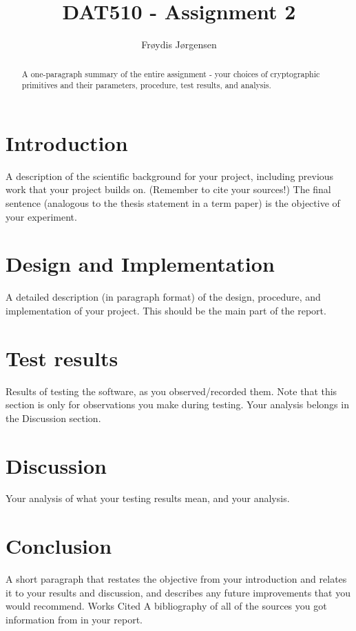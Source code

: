 \documentclass[12pt, letterpaper]{article}
\title{DAT510 - Assignment 2}
\author{Fr\o ydis J\o rgensen}
\begin{document}
\begin{titlepage}
\maketitle
\end{titlepage}

\begin{abstract}
A one-paragraph summary of the entire assignment - your choices of cryptographic primitives
and their parameters, procedure, test results, and analysis.
\end{abstract}

\section*{Introduction}
A description of the scientific background for your project, including previous work that your
project builds on. (Remember to cite your sources!) The final sentence (analogous to the thesis
statement in a term paper) is the objective of your experiment.

\section*{Design and Implementation}
A detailed description (in paragraph format) of the design, procedure, and implementation of
your project. This should be the main part of the report.

\section*{Test results}
Results of testing the software, as you observed/recorded them. Note that this section is only for
observations you make during testing. Your analysis belongs in the Discussion section.

\section*{Discussion}
Your analysis of what your testing results mean, and your analysis.

\section*{Conclusion}
A short paragraph that restates the objective from your introduction and relates it to your results
and discussion, and describes any future improvements that you would recommend. Works Cited A
bibliography of all of the sources you got information from in your report.
\end{document}
